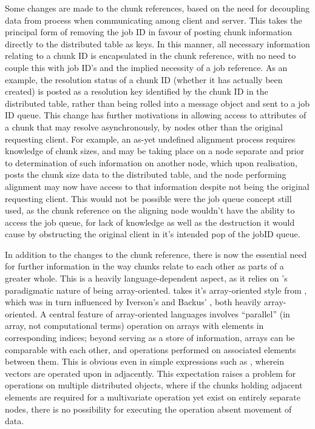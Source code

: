 Some changes are made to the chunk references, based on the need for decoupling data
from process when communicating among client and server.
This takes the principal form of removing the job ID in favour of posting chunk
information directly to the distributed table as keys.
In this manner, all necessary information relating to a chunk ID is
encapsulated in the chunk reference, with no need to couple this with job ID's
and the implied necessity of a job reference.
As an example, the resolution status of a chunk ID (whether it has actually
been created) is posted as a resolution key identified by the chunk ID in the
distributed table, rather than being rolled into a message object and sent to a
job ID queue.
This change has further motivations in allowing access to attributes of a chunk
that may resolve asynchronously, by nodes other than the original requesting
client.
For example, an as-yet undefined alignment process requires knowledge of chunk
sizes, and may be taking place on a node separate and prior to determination of
such information on another node, which upon realisation, posts the chunk size
data to the distributed table, and the node performing alignment may now have
access to that information despite not being the original requesting client.
This would not be possible were the job queue concept still used, as the chunk
reference on the aligning node wouldn't have the ability to access the job
queue, for lack of knowledge as well as the destruction it would cause by
obstructing the original client in it's intended pop of the jobID queue.

In addition to the changes to the chunk reference, there is now the essential
need for further information in the way chunks relate to each other as parts of
a greater whole.
This is a heavily language-dependent aspect, as it relies on \R{}'s paradigmatic
nature of being array-oriented.
\R{} takes it's array-oriented style from , which was in turn influenced by
Iverson's  and Backus' , both heavily
array-oriented\cites{becker1994shistory,iverson2007notation}.
A central feature of array-oriented languages involves ``parallel'' (in array,
not computational terms) operation on arrays with elements in corresponding
indices; beyond serving as a store of information, arrays can be comparable
with each other, and operations performed on associated elements between them.
This is obvious even in simple expressions such as 
, wherein vectors are operated upon in
adjacently.
This expectation raises a problem for operations on multiple distributed
objects, where if the chunks holding adjacent elements are required for a
multivariate operation yet exist on entirely separate nodes, there is no
possibility for executing the operation absent movement of data.

